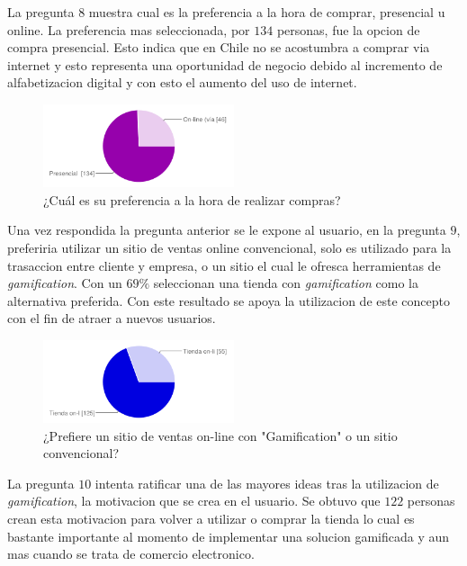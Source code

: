 La pregunta $8$ muestra cual es la preferencia a la hora de comprar, presencial u online. La preferencia 
mas seleccionada, por $134$ personas, fue la opcion de compra presencial. Esto indica que en Chile 
no se acostumbra a comprar via internet y esto representa una oportunidad de negocio debido al 
incremento de alfabetizacion digital y con esto el aumento del uso de internet.

\begin{figure}[!htb]
  \centering
  \includegraphics[width=0.5\textwidth]{images/chartPreg8.png}
  \caption[chart8]{¿Cuál es su preferencia a la hora de realizar compras?}
  \label{fig:chart2}
\end{figure} 

Una vez respondida la pregunta anterior se le expone al usuario, en la pregunta $9$,  preferiria 
utilizar un sitio de ventas online convencional, solo es utilizado para la trasaccion entre cliente 
y empresa, o un sitio el cual le ofresca herramientas de \emph{gamification}. Con un $69\%$ seleccionan
una tienda con \emph{gamification} como la alternativa preferida. Con este resultado se apoya la 
utilizacion de este concepto con el fin de atraer a nuevos usuarios.

\begin{figure}[!htb]
  \centering
  \includegraphics[width=0.5\textwidth]{images/chartPreg9.png}
  \caption[chart9]{¿Prefiere un sitio de ventas on-line con "Gamification" o un sitio convencional?}
  \label{fig:chart2}
\end{figure}
 
La pregunta $10$ intenta ratificar una de las mayores ideas tras la utilizacion de \emph{gamification}, 
la motivacion que se crea en el usuario. Se obtuvo que $122$ personas crean esta motivacion
para volver a utilizar o comprar la tienda lo cual es bastante importante al momento de implementar
una solucion gamificada y aun mas cuando se trata de comercio electronico.

